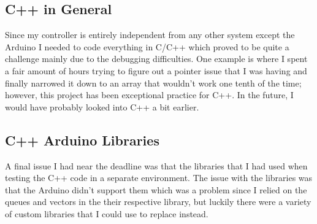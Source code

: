 \documentclass{article}
\begin{document}
\subsection{C++ in General}
Since my controller is entirely independent from any other system except the Arduino I needed to code everything in C/C++ which proved to be quite a challenge mainly due to the debugging difficulties. One example is where I spent a fair amount of hours trying to figure out a pointer issue that I was having and finally narrowed it down to an array that wouldn't work one tenth of the time; however, this project has been exceptional practice for C++. In the future, I would have probably looked into C++ a bit earlier.
\\

\subsection{C++ Arduino Libraries}
A final issue I had near the deadline was that the libraries that I had used when testing the C++ code in a separate environment. The issue with the libraries was that the Arduino didn't support them which was a problem since I relied on the queues and vectors in the their respective library, but luckily there were a variety of custom libraries that I could use to replace instead.
\end{document}
